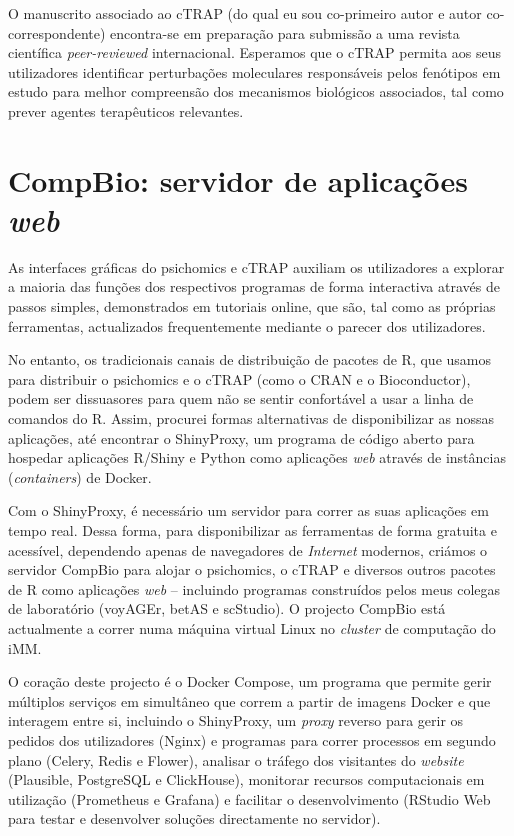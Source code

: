 O manuscrito associado ao cTRAP (do qual eu sou co-primeiro autor e autor co-correspondente) encontra-se em preparação para submissão a uma revista científica \emph{peer-reviewed} internacional. Esperamos que o cTRAP permita aos seus utilizadores identificar perturbações moleculares responsáveis pelos fenótipos em estudo para melhor compreensão dos mecanismos biológicos associados, tal como prever agentes terapêuticos relevantes.

\section*{CompBio: servidor de aplicações \emph{web}}

As interfaces gráficas do psichomics e cTRAP auxiliam os utilizadores a explorar a maioria das funções dos respectivos programas de forma interactiva através de passos simples, demonstrados em tutoriais online, que são, tal como as próprias ferramentas, actualizados frequentemente mediante o parecer dos utilizadores.

No entanto, os tradicionais canais de distribuição de pacotes de R, que usamos para distribuir o psichomics e o cTRAP (como o CRAN e o Bioconductor), podem ser dissuasores para quem não se sentir confortável a usar a linha de comandos do R. Assim, procurei formas alternativas de disponibilizar as nossas aplicações, até encontrar o ShinyProxy, um programa de código aberto para hospedar aplicações R/Shiny e Python como aplicações \emph{web} através de instâncias (\emph{containers}) de Docker.

Com o ShinyProxy, é necessário um servidor para correr as suas aplicações em tempo real. Dessa forma, para disponibilizar as ferramentas de forma gratuita e acessível, dependendo apenas de navegadores de \emph{Internet} modernos, criámos o servidor CompBio para alojar o psichomics, o cTRAP e diversos outros pacotes de R como aplicações \emph{web} -- incluindo programas construídos pelos meus colegas de laboratório (voyAGEr, betAS e scStudio). O projecto CompBio está actualmente a correr numa máquina virtual Linux no \emph{cluster} de computação do iMM.

O coração deste projecto é o Docker Compose, um programa que permite gerir múltiplos serviços em simultâneo que correm a partir de imagens Docker e que interagem entre si, incluindo o ShinyProxy, um \emph{proxy} reverso para gerir os pedidos dos utilizadores (Nginx) e programas para correr processos em segundo plano (Celery, \mbox{Redis} e Flower), analisar o tráfego dos visitantes do \emph{website} (Plausible, PostgreSQL e ClickHouse), monitorar recursos computacionais em utilização (Prometheus e \mbox{Grafana}) e facilitar o desenvolvimento (RStudio Web para testar e desenvolver soluções directamente no servidor).

